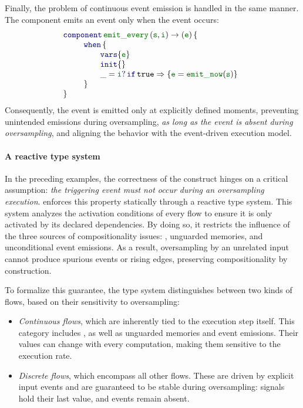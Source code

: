 Finally, the problem of continuous event emission is handled in the same manner. The component
 emits an event only when the event  occurs:
\begin{equation*}
    \componentTab{\idf{emit\_every}}{\idf{s}, \idf{i}}{\idf{e}}{
        \whenTab{\idf{e}}{}{
            \branch{\detect{\_}{\idf{i}}}{\true}{\idf{e} = \idf{emit\_now}(\idf{s})}
        }
    }
\end{equation*}
Consequently, the event  is emitted only at explicitly defined moments, preventing unintended
emissions during oversampling, \emph{as long as the event  is absent during oversampling},
and aligning the behavior with the event-driven execution model.

\paragraph{A reactive type system}

In the preceding examples, the correctness of the  construct hinges on a critical
assumption: \emph{the triggering event  must not occur during an oversampling execution}.
\GRust enforces this property statically through a reactive type system. This system analyzes the
activation conditions of every flow to ensure it is only activated by its declared dependencies. By
doing so, it restricts the influence of the three sources of compositionality issues: \timeop,
unguarded  memories, and unconditional event emissions. As a result, oversampling by an
unrelated input cannot produce spurious events or rising edges, preserving compositionality by
construction.

To formalize this guarantee, the type system distinguishes between two kinds of flows, based on
their sensitivity to oversampling:
%
\begin{itemize}
    \item \emph{Continuous flows}, which are inherently tied to the execution step itself. This
          category includes \timeop, as well as unguarded  memories and event emissions.
          Their values can change with every computation, making them sensitive to the execution
          rate.

    \item \emph{Discrete flows}, which encompass all other flows. These are driven by explicit input
          events and are guaranteed to be stable during oversampling: signals hold their last value,
          and events remain absent.
\end{itemize}

